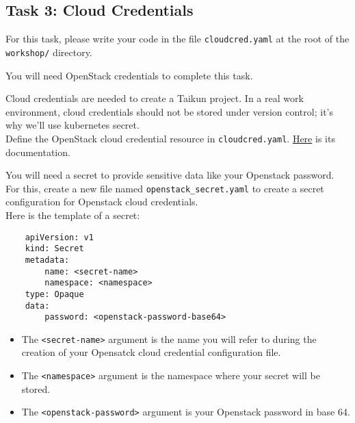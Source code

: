 \subsection{Task 3: Cloud Credentials}\label{sec:cloudcred}

\begin{note}
For this task, please write your code in the file \texttt{cloudcred.yaml}
at the root of the \texttt{workshop/} directory.\\
\end{note}

\begin{warn}
You will need OpenStack credentials to complete this task.
\end{warn}

Cloud credentials are needed to create a Taikun project.
In a real work environment,
cloud credentials should not be stored under version control;
it's why we'll use kubernetes secret.\\

Define the OpenStack cloud credential resource in \texttt{cloudcred.yaml}. \href{https://doc.crds.dev/github.com/itera-io/provider-jet-taikun/cloudcredential.taikun.jet.crossplane.io/Credential/v1alpha1}{Here} is its documentation.

You will need a secret to provide sensitive data like your Openstack password.
For this, create a new file named \texttt{openstack\_secret.yaml} to create a secret 
configuration for Openstack cloud credentials.\\

Here is the template of a secret:
\begin{verbatim}
    apiVersion: v1
    kind: Secret
    metadata:
        name: <secret-name>
        namespace: <namespace>
    type: Opaque
    data:
        password: <openstack-password-base64>
\end{verbatim}

\begin{itemize}
    \item The \texttt{<secret-name>} argument is the name you will refer to during the creation of your Opensatck cloud credential configuration file.
    \item The \texttt{<namespace>} argument is the namespace where your secret will be stored.
    \item The \texttt{<openstack-password>} argument is your Openstack password in base 64.
\end{itemize}

